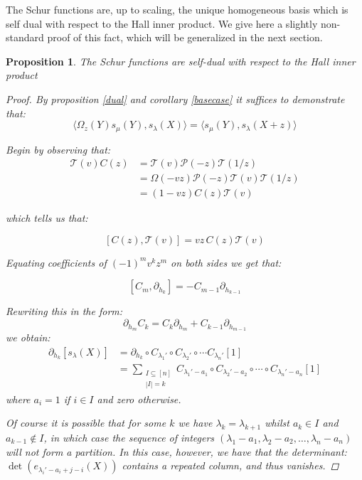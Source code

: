 \documentclass[12pt,dvips]{amsart}
\newtheorem{proposition}{Proposition}[section]
\begin{document}
The Schur functions are, up to scaling, the unique homogeneous basis which is self dual with respect to the Hall inner product. We give here a slightly non-standard proof of this fact, which will be generalized in the next section.



\begin{proposition} \label{vertex}
The Schur functions are self-dual with respect to the Hall inner product
\begin{proof}
By proposition \ref{dual} and corollary \ref{basecase} it suffices to demonstrate that:
$$ \langle \Omega_z(Y) s_\mu(Y), s_\lambda(X) \rangle = \langle s_\mu(Y), s_\lambda(X + z) \rangle $$



\par\bigskip


\noindent
Begin by observing that:
\begin{align*}
\mathcal{T}(v) C(z) & =  \mathcal{T}(v) \mathcal{P}(-z) \mathcal{T}(1/z) \\
& =  \Omega(-vz) \mathcal{P}(-z) \mathcal{T}(v) \mathcal{T}(1/z) \\
& =  (1-vz) C(z) \mathcal{T}(v) 
\end{align*}

\noindent
which tells us that:

$$ [C(z), \mathcal{T}(v)]  = vz \, C(z) \mathcal{T}(v) $$

\par\bigskip
Equating coefficients of $(-1)^m v^k z^m$ on both sides we get that:

$$ [ C_m, \partial_{h_k} ] = - C_{m-1} \partial_{h_{k-1}} $$

\noindent
Rewriting this in the form:
$$ \partial_{h_m} C_k = C_k \partial_{h_m} + C_{k-1} \partial_{h_{m-1}} $$
we obtain:
\begin{align*}
\partial_{h_k} [s_\lambda(X)] & =  \partial_{h_k} \circ C_{\lambda_1'} \circ C_{\lambda_2'} \circ \cdots C_{\lambda_n'}[1] \\
& =  \sum_{\substack{I \subseteq [n] \\ |I| = k}} C_{\lambda_1' - a_1} \circ C_{\lambda_2' - a_2} \circ \cdots \circ C_{\lambda_n' - a_n}[1]
\end{align*}
where $a_i = 1$ if $i \in I$ and zero otherwise. 



Of course it is possible that for some $k$ we have $\lambda_k = \lambda_{k+1}$ whilst $a_k \in I$ and $a_{k-1} \not \in I$, in which case the sequence of integers $(\lambda_1 - a_1, \lambda_2 - a_2, \ldots, \lambda_n - a_n)$ will not form a partition. In this case, however, we have that the determinant:
$ \det( e_{\lambda_i' - a_i + j - i}(X) ) $
contains a repeated column, and thus vanishes. 


\end{proof}
\end{proposition}
\end{document}
